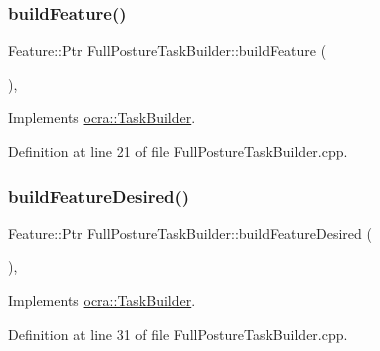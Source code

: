 \subsubsection{\texorpdfstring{build\+Feature()}{buildFeature()}}
{\footnotesize\ttfamily Feature\+::\+Ptr Full\+Posture\+Task\+Builder\+::build\+Feature (\begin{DoxyParamCaption}{ }\end{DoxyParamCaption})\hspace{0.3cm}{\ttfamily [protected]}, {\ttfamily [virtual]}}



Implements \hyperlink{classocra_1_1TaskBuilder_a58c0dc416a9607a344a080248ee26ac2}{ocra\+::\+Task\+Builder}.



Definition at line 21 of file Full\+Posture\+Task\+Builder.\+cpp.

\hypertarget{classocra_1_1FullPostureTaskBuilder_ac9ea83ee3f872995c6dc214e91fc28a0}{}\label{classocra_1_1FullPostureTaskBuilder_ac9ea83ee3f872995c6dc214e91fc28a0} 
\subsubsection{\texorpdfstring{build\+Feature\+Desired()}{buildFeatureDesired()}}
{\footnotesize\ttfamily Feature\+::\+Ptr Full\+Posture\+Task\+Builder\+::build\+Feature\+Desired (\begin{DoxyParamCaption}{ }\end{DoxyParamCaption})\hspace{0.3cm}{\ttfamily [protected]}, {\ttfamily [virtual]}}



Implements \hyperlink{classocra_1_1TaskBuilder_a7a2c8bcc5d95160d0e48806a2648f1a5}{ocra\+::\+Task\+Builder}.



Definition at line 31 of file Full\+Posture\+Task\+Builder.\+cpp.

\hypertarget{classocra_1_1FullPostureTaskBuilder_a0f3852057b316baa402806fb320d257b}{}\label{classocra_1_1FullPostureTaskBuilder_a0f3852057b316baa402806fb320d257b} 
